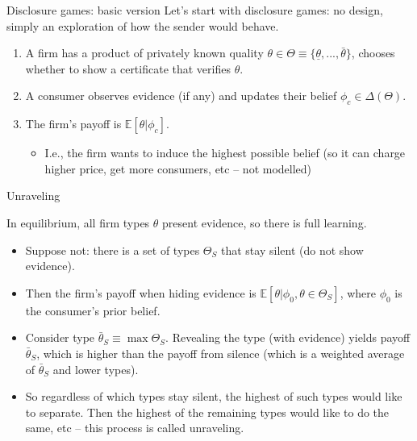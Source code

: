 \documentclass[english,10pt
,aspectratio=169
]{beamer}
\begin{document}
\begin{frame}{Disclosure games: basic version \citep{grossman_informational_1981}}
	Let's start with \alert{disclosure games}: no design, simply an exploration of how the sender would behave.
	\begin{enumerate}[<+->]
		\item A firm has a product of privately known quality $\theta \in \Theta \equiv \{\underline{\theta}, ..., \bar{\theta}\}$, chooses whether to show a certificate that verifies $\theta$.
		
		\item A consumer observes evidence (if any) and updates their belief $\phi_c \in \varDelta(\Theta)$.
		
		\item The firm's payoff is $\mathbb{E}[\theta | \phi_c]$.
		\begin{itemize}
			\item I.e., the firm wants to induce the highest possible belief (so it can charge higher price, get more consumers, etc -- not modelled)
		\end{itemize}
	\end{enumerate}
\end{frame}


\begin{frame}{Unraveling}
	\begin{theorem}[Unraveling]
		In equilibrium, all firm types $\theta$ present evidence, so there is full learning.
	\end{theorem}
	\begin{itemize}[<+->]
		\item Suppose not: there is a set of types $\Theta_S$ that stay silent (do not show evidence).
		\item Then the firm's payoff when hiding evidence is $\mathbb{E}[\theta | \phi_0, \theta \in \Theta_S]$, where $\phi_0$ is the consumer's prior belief.
		\item Consider type $\bar{\theta}_S \equiv \max \Theta_S$. Revealing the type (with evidence) yields payoff $\bar{\theta}_S$, which is higher than the payoff from silence (which is a weighted average of $\bar{\theta}_S$ and lower types).
		\item So regardless of which types stay silent, the highest of such types would like to separate. Then the highest of the remaining types would like to do the same, etc -- this process is called \alert{unraveling}.
	\end{itemize}
\end{frame}
\end{document}
